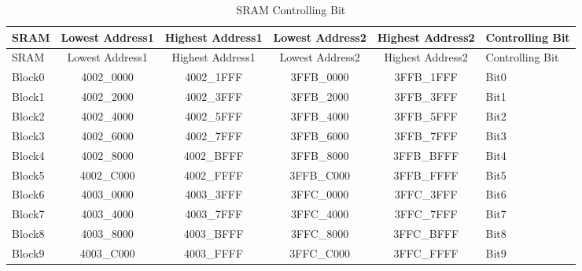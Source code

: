 \documentclass[main\_\_EN.tex]{subfiles}
\begin{document}
\begin{longtable}[c]{|l|c|c|c|c|l|}
\caption{SRAM Controlling Bit} \label{table:sramcontrollingbit} \\
\hline
\rowcolor{lightgray}
SRAM & Lowest Address1 & Highest Address1 & Lowest Address2 & Highest Address2 & Controlling Bit \\
\hline
\endfirsthead

\hline
\rowcolor{lightgray}
SRAM & Lowest Address1 & Highest Address1 & Lowest Address2 & Highest Address2 & Controlling Bit \\
\hline
\endhead

\hline
\endfoot

\hline
\endlastfoot

Block0  & \hexprefix{}4002\_0000    & \hexprefix{}4002\_1FFF     & \hexprefix{}3FFB\_0000    & \hexprefix{}3FFB\_1FFF     & Bit0 \\\hline
Block1  & \hexprefix{}4002\_2000    & \hexprefix{}4002\_3FFF     & \hexprefix{}3FFB\_2000    & \hexprefix{}3FFB\_3FFF     & Bit1 \\\hline
Block2  & \hexprefix{}4002\_4000    & \hexprefix{}4002\_5FFF     & \hexprefix{}3FFB\_4000    & \hexprefix{}3FFB\_5FFF     & Bit2 \\\hline
Block3  & \hexprefix{}4002\_6000    & \hexprefix{}4002\_7FFF     & \hexprefix{}3FFB\_6000    & \hexprefix{}3FFB\_7FFF     & Bit3 \\\hline
Block4  & \hexprefix{}4002\_8000    & \hexprefix{}4002\_BFFF     & \hexprefix{}3FFB\_8000    & \hexprefix{}3FFB\_BFFF     & Bit4 \\\hline
Block5  & \hexprefix{}4002\_C000    & \hexprefix{}4002\_FFFF     & \hexprefix{}3FFB\_C000    & \hexprefix{}3FFB\_FFFF     & Bit5 \\\hline

Block6  & \hexprefix{}4003\_0000    & \hexprefix{}4003\_3FFF     & \hexprefix{}3FFC\_0000    & \hexprefix{}3FFC\_3FFF     & Bit6 \\\hline
Block7  & \hexprefix{}4003\_4000    & \hexprefix{}4003\_7FFF     & \hexprefix{}3FFC\_4000    & \hexprefix{}3FFC\_7FFF     & Bit7 \\\hline
Block8  & \hexprefix{}4003\_8000    & \hexprefix{}4003\_BFFF     & \hexprefix{}3FFC\_8000    & \hexprefix{}3FFC\_BFFF     & Bit8 \\\hline
Block9  & \hexprefix{}4003\_C000    & \hexprefix{}4003\_FFFF     & \hexprefix{}3FFC\_C000    & \hexprefix{}3FFC\_FFFF     & Bit9 \\\hline


\end{longtable}
\end{document}

